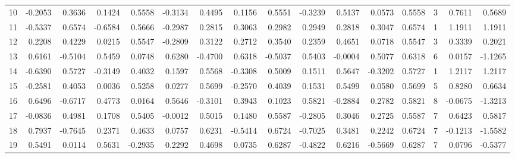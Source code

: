 \begin{tabular}{lrrrrrrrrrrrrrrr}
10 &     -0.2053 &  0.3636 &  0.1424 &  0.5558 & -0.3134 &  0.4495 &  0.1156 &  0.5551 & -0.3239 &  0.5137 &   0.0573 &     0.5558 &      3 &                    0.7611 &                     0.5689 \\
11 &     -0.5337 &  0.6574 & -0.6584 &  0.5666 & -0.2987 &  0.2815 &  0.3063 &  0.2982 &  0.2949 &  0.2818 &   0.3047 &     0.6574 &      1 &                    1.1911 &                     1.1911 \\
12 &      0.2208 &  0.4229 &  0.0215 &  0.5547 & -0.2809 &  0.3122 &  0.2712 &  0.3540 &  0.2359 &  0.4651 &   0.0718 &     0.5547 &      3 &                    0.3339 &                     0.2021 \\
13 &      0.6161 & -0.5104 &  0.5459 &  0.0748 &  0.6280 & -0.4700 &  0.6318 & -0.5037 &  0.5403 & -0.0004 &   0.5077 &     0.6318 &      6 &                    0.0157 &                    -1.1265 \\
14 &     -0.6390 &  0.5727 & -0.3149 &  0.4032 &  0.1597 &  0.5568 & -0.3308 &  0.5009 &  0.1511 &  0.5647 &  -0.3202 &     0.5727 &      1 &                    1.2117 &                     1.2117 \\
15 &     -0.2581 &  0.4053 &  0.0036 &  0.5258 &  0.0277 &  0.5699 & -0.2570 &  0.4039 &  0.1531 &  0.5499 &   0.0580 &     0.5699 &      5 &                    0.8280 &                     0.6634 \\
16 &      0.6496 & -0.6717 &  0.4773 &  0.0164 &  0.5646 & -0.3101 &  0.3943 &  0.1023 &  0.5821 & -0.2884 &   0.2782 &     0.5821 &      8 &                   -0.0675 &                    -1.3213 \\
17 &     -0.0836 &  0.4981 &  0.1708 &  0.5405 & -0.0012 &  0.5015 &  0.1480 &  0.5587 & -0.2805 &  0.3046 &   0.2725 &     0.5587 &      7 &                    0.6423 &                     0.5817 \\
18 &      0.7937 & -0.7645 &  0.2371 &  0.4633 &  0.0757 &  0.6231 & -0.5414 &  0.6724 & -0.7025 &  0.3481 &   0.2242 &     0.6724 &      7 &                   -0.1213 &                    -1.5582 \\
19 &      0.5491 &  0.0114 &  0.5631 & -0.2935 &  0.2292 &  0.4698 &  0.0735 &  0.6287 & -0.4822 &  0.6216 &  -0.5669 &     0.6287 &      7 &                    0.0796 &                    -0.5377 \\
\bottomrule
\end{tabular}
